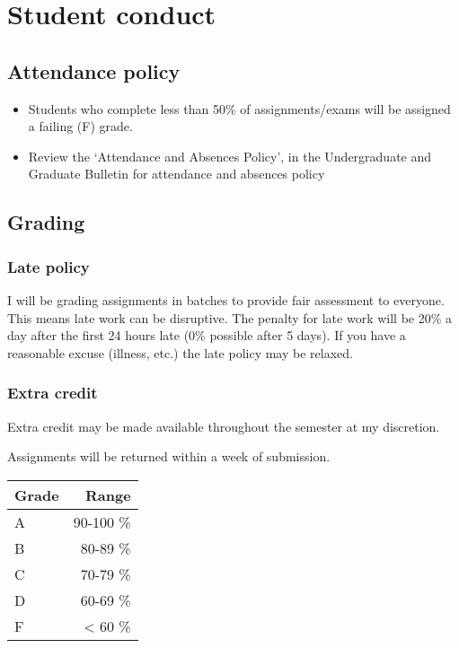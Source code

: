 \documentclass[11pt,]{article}
\begin{document}
\newpage

\hypertarget{student-conduct}{%
\section{Student conduct}\label{student-conduct}}

\hypertarget{attendance-policy}{%
\subsection{Attendance policy}\label{attendance-policy}}

\begin{itemize}
\item
  Students who complete less than 50\% of assignments/exams will be
  assigned a failing (F) grade.
\item
  Review the `Attendance and Absences Policy', in the Undergraduate and
  Graduate Bulletin for attendance and absences policy
\end{itemize}

\hypertarget{grading}{%
\subsection{Grading}\label{grading}}

\hypertarget{late-policy}{%
\subsubsection{Late policy}\label{late-policy}}

I will be grading assignments in batches to provide fair assessment to
everyone. This means late work can be disruptive. The penalty for late
work will be 20\% a day after the first 24 hours late (0\% possible
after 5 days). If you have a reasonable excuse (illness, etc.) the late
policy may be relaxed.

\hypertarget{extra-credit}{%
\subsubsection{Extra credit}\label{extra-credit}}

Extra credit may be made available throughout the semester at my
discretion.

Assignments will be returned within a week of submission.

\begin{longtable}[]{@{}lr@{}}
\toprule()
Grade & Range \\
\midrule()
\endhead
A & 90-100 \% \\
B & 80-89 \% \\
C & 70-79 \% \\
D & 60-69 \% \\
F & \textless{} 60 \% \\
\bottomrule()
\end{longtable}
\end{document}
